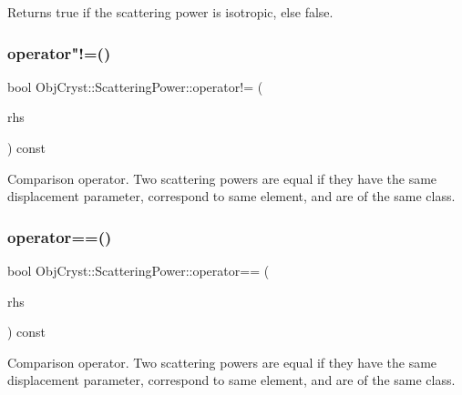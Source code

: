 Returns true if the scattering power is isotropic, else false. 

\mbox{\label{class_obj_cryst_1_1_scattering_power_af898f48dfd85caf200be1e30263145cb}} 
\subsubsection{\texorpdfstring{operator"!=()}{operator!=()}}
{\footnotesize\ttfamily bool Obj\+Cryst\+::\+Scattering\+Power\+::operator!= (\begin{DoxyParamCaption}\item[{const \mbox{\hyperlink{class_obj_cryst_1_1_scattering_power}{Scattering\+Power}} \&}]{rhs }\end{DoxyParamCaption}) const\hspace{0.3cm}{\ttfamily [virtual]}}

Comparison operator. Two scattering powers are equal if they have the same displacement parameter, correspond to same element, and are of the same class. \mbox{\label{class_obj_cryst_1_1_scattering_power_a62eb0d6d4518cef7c28c377bd3ac9fe4}} 
\subsubsection{\texorpdfstring{operator==()}{operator==()}}
{\footnotesize\ttfamily bool Obj\+Cryst\+::\+Scattering\+Power\+::operator== (\begin{DoxyParamCaption}\item[{const \mbox{\hyperlink{class_obj_cryst_1_1_scattering_power}{Scattering\+Power}} \&}]{rhs }\end{DoxyParamCaption}) const\hspace{0.3cm}{\ttfamily [virtual]}}

Comparison operator. Two scattering powers are equal if they have the same displacement parameter, correspond to same element, and are of the same class. \mbox{\label{class_obj_cryst_1_1_scattering_power_aee5ad2e8325feea42430bd1ed54eabfc}} 
